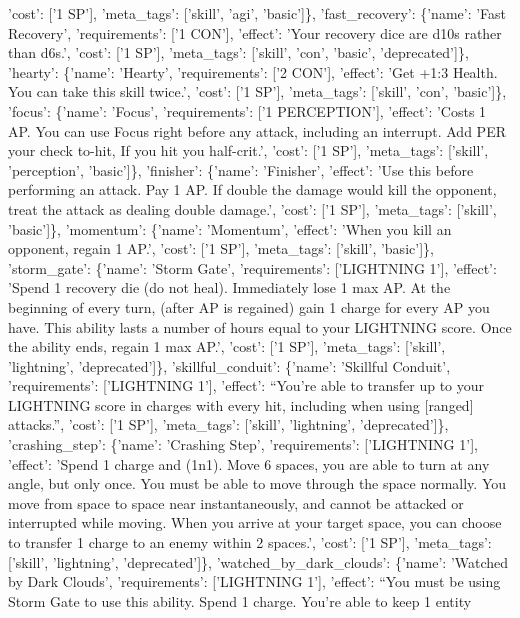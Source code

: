 \documentclass[
  letterpaper,
  DIV=11,
  numbers=noendperiod]{scrartcl}
\begin{document}
{'cost': {[}'1 SP'{]}, 'meta\_tags': {[}'skill', 'agi', 'basic'{]}\},
'fast\_recovery': \{'name': 'Fast Recovery', 'requirements': {[}'1
CON'{]}, 'effect': 'Your recovery dice are d10s rather than d6s.',
'cost': {[}'1 SP'{]}, 'meta\_tags': {[}'skill', 'con', 'basic',
'deprecated'{]}\}, 'hearty': \{'name': 'Hearty', 'requirements': {[}'2
CON'{]}, 'effect': 'Get +1:3 Health. You can take this skill twice.',
'cost': {[}'1 SP'{]}, 'meta\_tags': {[}'skill', 'con', 'basic'{]}\},
'focus': \{'name': 'Focus', 'requirements': {[}'1 PERCEPTION'{]},
'effect': 'Costs 1 AP. You can use Focus right before any attack,
including an interrupt. Add PER your check to-hit, If you hit you
half-crit.', 'cost': {[}'1 SP'{]}, 'meta\_tags': {[}'skill',
'perception', 'basic'{]}\}, 'finisher': \{'name': 'Finisher', 'effect':
'Use this before performing an attack. Pay 1 AP. If double the damage
would kill the opponent, treat the attack as dealing double damage.',
'cost': {[}'1 SP'{]}, 'meta\_tags': {[}'skill', 'basic'{]}\},
'momentum': \{'name': 'Momentum', 'effect': 'When you kill an opponent,
regain 1 AP.', 'cost': {[}'1 SP'{]}, 'meta\_tags': {[}'skill',
'basic'{]}\}, 'storm\_gate': \{'name': 'Storm Gate', 'requirements':
{[}'LIGHTNING 1'{]}, 'effect': 'Spend 1 recovery die (do not heal).
Immediately lose 1 max AP. At the beginning of every turn, (after AP is
regained) gain 1 charge for every AP you have. This ability lasts a
number of hours equal to your LIGHTNING score. Once the ability ends,
regain 1 max AP.', 'cost': {[}'1 SP'{]}, 'meta\_tags': {[}'skill',
'lightning', 'deprecated'{]}\}, 'skillful\_conduit': \{'name': 'Skillful
Conduit', 'requirements': {[}'LIGHTNING 1'{]}, 'effect': ``You're able
to transfer up to your LIGHTNING score in charges with every hit,
including when using {[}ranged{]} attacks.'', 'cost': {[}'1 SP'{]},
'meta\_tags': {[}'skill', 'lightning', 'deprecated'{]}\},
'crashing\_step': \{'name': 'Crashing Step', 'requirements':
{[}'LIGHTNING 1'{]}, 'effect': 'Spend 1 charge and (1n1). Move 6 spaces,
you are able to turn at any angle, but only once. You must be able to
move through the space normally. You move from space to space near
instantaneously, and cannot be attacked or interrupted while moving.
When you arrive at your target space, you can choose to transfer 1
charge to an enemy within 2 spaces.', 'cost': {[}'1 SP'{]},
'meta\_tags': {[}'skill', 'lightning', 'deprecated'{]}\},
'watched\_by\_dark\_clouds': \{'name': 'Watched by Dark Clouds',
'requirements': {[}'LIGHTNING 1'{]}, 'effect': ``You must be using Storm
Gate to use this ability. Spend 1 charge. You're able to keep 1 entity
}
\end{document}
